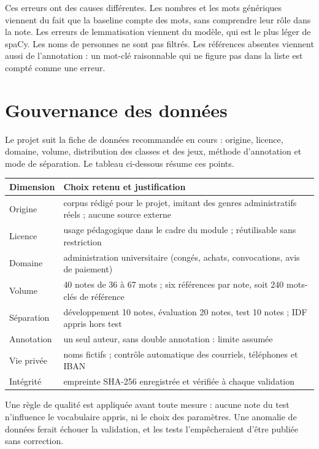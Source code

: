 \documentclass[11pt,a4paper]{article}
\begin{document}
Ces erreurs ont des causes différentes. Les nombres et les mots génériques viennent du fait que la baseline compte des mots, sans comprendre leur rôle dans la note. Les erreurs de lemmatisation viennent du modèle, qui est le plus léger de spaCy. Les noms de personnes ne sont pas filtrés. Les références absentes viennent aussi de l'annotation : un mot-clé raisonnable qui ne figure pas dans la liste est compté comme une erreur.


\section{Gouvernance des données}

Le projet suit la fiche de données recommandée en cours : origine, licence, domaine, volume, distribution des classes et des jeux, méthode d'annotation et mode de séparation. Le tableau ci-dessous résume ces points.

\begin{center}
{\small
\begin{tabular}{p{3.6cm}p{10.5cm}}
\toprule
Dimension & Choix retenu et justification \\
\midrule
Origine & corpus rédigé pour le projet, imitant des genres administratifs réels ; aucune source externe \\
Licence & usage pédagogique dans le cadre du module ; réutilisable sans restriction \\
Domaine & administration universitaire (congés, achats, convocations, avis de paiement) \\
Volume & 40 notes de 36 à 67 mots ; six références par note, soit 240 mots-clés de référence \\
Séparation & développement 10 notes, évaluation 20 notes, test 10 notes ; IDF appris hors test \\
Annotation & un seul auteur, sans double annotation : limite assumée \\
Vie privée & noms fictifs ; contrôle automatique des courriels, téléphones et IBAN \\
Intégrité & empreinte SHA-256 enregistrée et vérifiée à chaque validation \\
\bottomrule
\end{tabular}
}
\end{center}

Une règle de qualité est appliquée avant toute mesure : aucune note du test n'influence le vocabulaire appris, ni le choix des paramètres. Une anomalie de données ferait échouer la validation, et les tests l'empêcheraient d'être publiée sans correction.
\end{document}
